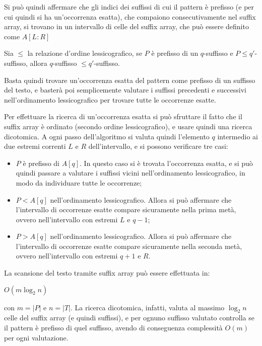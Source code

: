 Si può quindi affermare che gli indici dei suffissi di cui il pattern è prefisso (e per cui quindi si ha un'occorrenza esatta), che compaiono consecutivamente nel suffix array, si trovano in un intervallo di celle del suffix array, che può essere definito come $A[L : R]$

\begin{rem}
    Sia $\le$ la relazione d'ordine lessicografico, se $P$ è prefisso di un $q$-suffisso e $P \le q'$-suffisso, allora $q$-suffisso $\le q'$-suffisso.
\end{rem}
Basta quindi trovare un'occorrenza esatta del pattern come prefisso di un suffisso del testo, e basterà poi semplicemente valutare i suffissi precedenti e successivi nell'ordinamento lessicografico per trovare tutte le occorrenze esatte.

Per effettuare la ricerca di un'occorrenza esatta si può sfruttare il fatto che il suffix array è ordinato (secondo ordine lessicografico), e usare quindi una ricerca dicotomica.
A ogni passo dell'algoritmo si valuta quindi l'elemento $q$ intermedio ai due estremi correnti $L$ e $R$ dell'intervallo, e si possono verificare tre casi:
\begin{itemize}
    \item $P$ è prefisso di $A[q]$. In questo caso si è trovata l'occorrenza esatta, e si può quindi passare a valutare i suffissi vicini nell'ordinamento lessicografico, in modo da individuare tutte le occorrenze;
    \item $P < A[q]$ nell'ordinamento lessicografico. Allora si può affermare che l'intervallo di occorrenze esatte compare sicuramente nella prima metà, ovvero nell'intervallo con estremi $L$ e $q-1$;
    \item $P > A[q]$ nell'ordinamento lessicografico.
    Allora si può affermare che l'intervallo di occorrenze esatte compare sicuramente nella seconda metà, ovvero nell'intervallo con estremi $q+1$ e $R$.
\end{itemize}


La scansione del testo tramite suffix array può essere effettuata in:
\begin{center}
    $O(m \log_2 n)$    
\end{center}
con $m = |P|$ e $n = |T|$.
La ricerca dicotomica, infatti, valuta al massimo $\log_2 n$ celle del suffix array (e quindi suffissi), e per ognuno suffisso valutato controlla se il pattern è prefisso di quel suffisso, avendo di conseguenza complessità $O(m)$ per ogni valutazione.

